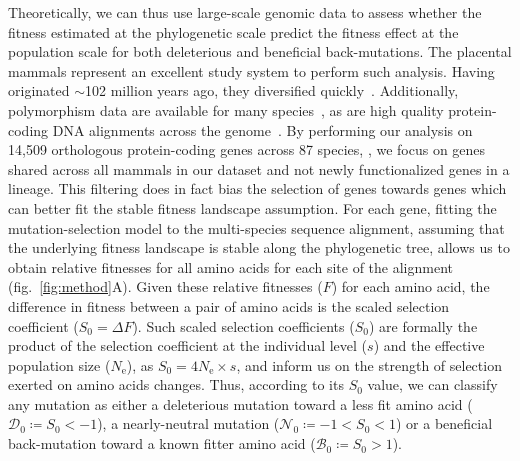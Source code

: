 \documentclass{article}
\newcommand{\Ne}{N_{\text{e}}}
\newcommand{\Sphy}{S_{0}}
\newcommand{\SphyDel}{\mathcal{D}_0}
\newcommand{\SphyNeu}{\mathcal{N}_0}
\newcommand{\SphyBen}{\mathcal{B}_0}
\begin{document}
    Theoretically, we can thus use large-scale genomic data to assess whether the fitness estimated at the phylogenetic scale predict the fitness effect at the population scale for both deleterious and beneficial back-mutations.
    The placental mammals represent an excellent study system to perform such analysis.
    Having originated $\sim$102 million years ago, they diversified quickly~\cite{foley_genomic_2023}.
    Additionally, polymorphism data are available for many species~\cite{howe_ensembl_2021}, as are high quality protein-coding DNA alignments across the genome~\cite{ranwez_orthomam_2007, scornavacca_orthomam_2019}.
    By performing our analysis on 14,509 orthologous protein-coding genes across 87 species, , we focus on genes shared across all mammals in our dataset and not newly functionalized genes in a lineage.
    This filtering does in fact bias the selection of genes towards genes which can better fit the stable fitness landscape assumption.
    For each gene, fitting the mutation-selection model to the multi-species sequence alignment, assuming that the underlying fitness landscape is stable along the phylogenetic tree, allows us to obtain relative fitnesses for all amino acids for each site of the alignment (fig.~\ref{fig:method}A).
    Given these relative fitnesses ($F$) for each amino acid, the difference in fitness between a pair of amino acids is the scaled selection coefficient ($\Sphy = \Delta F$).
    Such scaled selection coefficients ($\Sphy$) are formally the product of the selection coefficient at the individual level ($s$) and the effective population size ($\Ne$), as $\Sphy = 4 \Ne \times s$, and inform us on the strength of selection exerted on amino acids changes.
    Thus, according to its $\Sphy$ value, we can classify any mutation as either a deleterious mutation toward a less fit amino acid ($\SphyDel \coloneqq \Sphy < -1$), a nearly-neutral mutation ($\SphyNeu \coloneqq -1 < \Sphy <1$) or a beneficial back-mutation toward a known fitter amino acid ($\SphyBen \coloneqq \Sphy > 1$).
\end{document}
